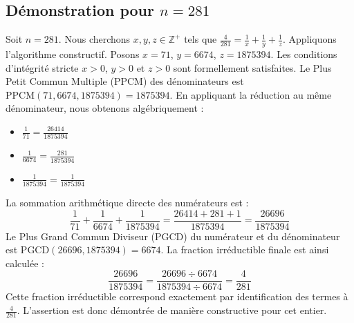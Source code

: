 \documentclass[11pt,a4paper]{article}
\begin{document}
\subsection{Démonstration pour $n = 281$}
Soit $n = 281$. Nous cherchons $x, y, z \in \mathbb{Z}^{+}$ tels que $\frac{4}{281} = \frac{1}{x} + \frac{1}{y} + \frac{1}{z}$.
Appliquons l'algorithme constructif. Posons $x = 71$, $y = 6674$, $z = 1875394$.
Les conditions d'intégrité stricte $x > 0$, $y > 0$ et $z > 0$ sont formellement satisfaites.
Le Plus Petit Commun Multiple (PPCM) des dénominateurs est $\text{PPCM}(71, 6674, 1875394) = 1875394$.
En appliquant la réduction au même dénominateur, nous obtenons algébriquement :
\begin{itemize}
    \item $\frac{1}{71} = \frac{26414}{1875394}$
    \item $\frac{1}{6674} = \frac{281}{1875394}$
    \item $\frac{1}{1875394} = \frac{1}{1875394}$
\end{itemize}
La sommation arithmétique directe des numérateurs est :
$$ \frac{1}{71} + \frac{1}{6674} + \frac{1}{1875394} = \frac{26414 + 281 + 1}{1875394} = \frac{26696}{1875394} $$
Le Plus Grand Commun Diviseur (PGCD) du numérateur et du dénominateur est $\text{PGCD}(26696, 1875394) = 6674$.
La fraction irréductible finale est ainsi calculée :
$$ \frac{26696}{1875394} = \frac{26696 \div 6674}{1875394 \div 6674} = \frac{4}{281} $$
Cette fraction irréductible correspond exactement par identification des termes à $\frac{4}{281}$. L'assertion est donc démontrée de manière constructive pour cet entier.
\end{document}
